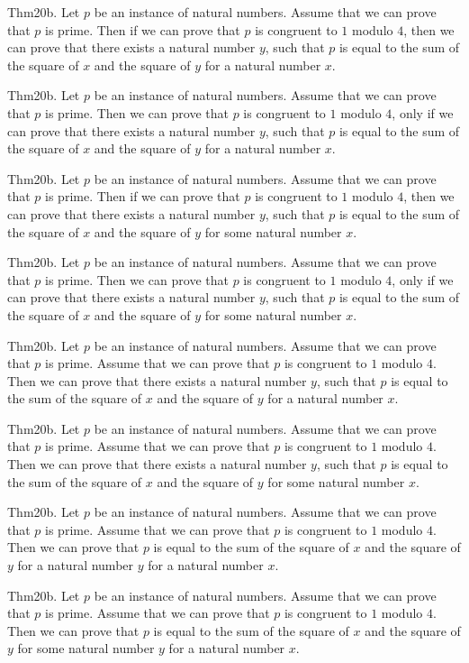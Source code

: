 \documentclass{article}
\begin{document}
Thm20b. Let $p$ be an instance of natural numbers. Assume that we can prove that $p$ is prime. Then if we can prove that $p$ is congruent to $1$ modulo $4$, then we can prove that there exists a natural number $y$, such that $p$ is equal to the sum of the square of $x$ and the square of $y$ for a natural number $x$.

Thm20b. Let $p$ be an instance of natural numbers. Assume that we can prove that $p$ is prime. Then we can prove that $p$ is congruent to $1$ modulo $4$, only if we can prove that there exists a natural number $y$, such that $p$ is equal to the sum of the square of $x$ and the square of $y$ for a natural number $x$.

Thm20b. Let $p$ be an instance of natural numbers. Assume that we can prove that $p$ is prime. Then if we can prove that $p$ is congruent to $1$ modulo $4$, then we can prove that there exists a natural number $y$, such that $p$ is equal to the sum of the square of $x$ and the square of $y$ for some natural number $x$.

Thm20b. Let $p$ be an instance of natural numbers. Assume that we can prove that $p$ is prime. Then we can prove that $p$ is congruent to $1$ modulo $4$, only if we can prove that there exists a natural number $y$, such that $p$ is equal to the sum of the square of $x$ and the square of $y$ for some natural number $x$.

Thm20b. Let $p$ be an instance of natural numbers. Assume that we can prove that $p$ is prime. Assume that we can prove that $p$ is congruent to $1$ modulo $4$. Then we can prove that there exists a natural number $y$, such that $p$ is equal to the sum of the square of $x$ and the square of $y$ for a natural number $x$.

Thm20b. Let $p$ be an instance of natural numbers. Assume that we can prove that $p$ is prime. Assume that we can prove that $p$ is congruent to $1$ modulo $4$. Then we can prove that there exists a natural number $y$, such that $p$ is equal to the sum of the square of $x$ and the square of $y$ for some natural number $x$.

Thm20b. Let $p$ be an instance of natural numbers. Assume that we can prove that $p$ is prime. Assume that we can prove that $p$ is congruent to $1$ modulo $4$. Then we can prove that $p$ is equal to the sum of the square of $x$ and the square of $y$ for a natural number $y$ for a natural number $x$.

Thm20b. Let $p$ be an instance of natural numbers. Assume that we can prove that $p$ is prime. Assume that we can prove that $p$ is congruent to $1$ modulo $4$. Then we can prove that $p$ is equal to the sum of the square of $x$ and the square of $y$ for some natural number $y$ for a natural number $x$.
\end{document}
